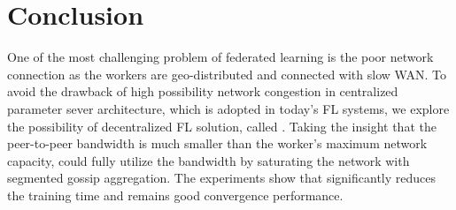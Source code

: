 \section{Conclusion}
One of the most challenging problem of federated learning is the poor network connection as the workers are geo-distributed and connected with slow WAN. To avoid the drawback of high possibility network congestion in centralized parameter sever architecture, which is adopted in today's FL systems, we explore the possibility of decentralized FL solution, called \sys. Taking the insight that the peer-to-peer bandwidth is much smaller than the worker's maximum network capacity, \sys could fully utilize the bandwidth by saturating the network with segmented gossip aggregation. The experiments show that \sys significantly reduces the training time and remains good convergence performance.
